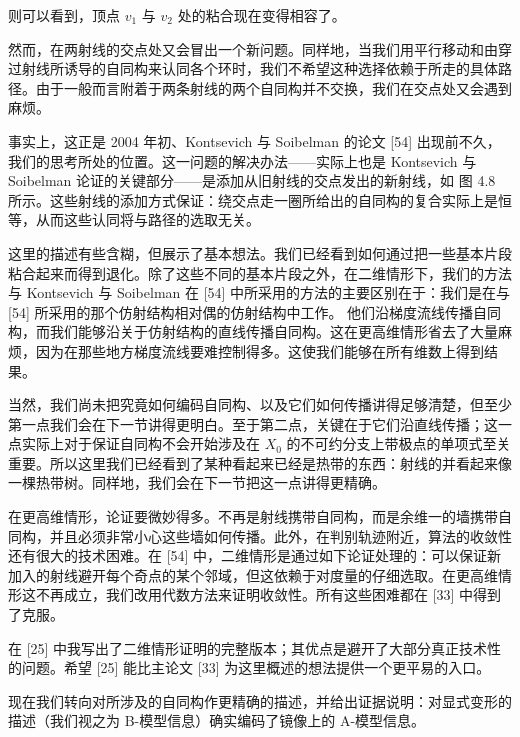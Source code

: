 
则可以看到，顶点 $v_1$ 与 $v_2$ 处的粘合现在变得相容了。

然而，在两射线的交点处又会冒出一个新问题。同样地，当我们用平行移动和由穿过射线所诱导的自同构来认同各个环时，我们不希望这种选择依赖于所走的具体路径。由于一般而言附着于两条射线的两个自同构并不交换，我们在交点处又会遇到麻烦。

事实上，这正是 2004 年初、Kontsevich 与 Soibelman 的论文 [54] 出现前不久，我们的思考所处的位置。这一问题的解决办法------实际上也是 Kontsevich 与 Soibelman 论证的关键部分------是添加从旧射线的交点发出的新射线，如 图 4.8 所示。这些射线的添加方式保证：绕交点走一圈所给出的自同构的复合实际上是恒等，从而这些认同将与路径的选取无关。

这里的描述有些含糊，但展示了基本想法。我们已经看到如何通过把一些基本片段粘合起来而得到退化。除了这些不同的基本片段之外，在二维情形下，我们的方法与 Kontsevich 与 Soibelman 在 [54] 中所采用的方法的主要区别在于：我们是在与 [54] 所采用的那个仿射结构相对偶的仿射结构中工作。
他们沿梯度流线传播自同构，而我们能够沿关于仿射结构的直线传播自同构。这在更高维情形省去了大量麻烦，因为在那些地方梯度流线要难控制得多。这使我们能够在所有维数上得到结果。

当然，我们尚未把究竟如何编码自同构、以及它们如何传播讲得足够清楚，但至少第一点我们会在下一节讲得更明白。至于第二点，关键在于它们沿直线传播；这一点实际上对于保证自同构不会开始涉及在 $X_0$ 的不可约分支上带极点的单项式至关重要。所以这里我们已经看到了某种看起来已经是热带的东西：射线的并看起来像一棵热带树。同样地，我们会在下一节把这一点讲得更精确。

在更高维情形，论证要微妙得多。不再是射线携带自同构，而是余维一的墙携带自同构，并且必须非常小心这些墙如何传播。此外，在判别轨迹附近，算法的收敛性还有很大的技术困难。在 [54] 中，二维情形是通过如下论证处理的：可以保证新加入的射线避开每个奇点的某个邻域，但这依赖于对度量的仔细选取。在更高维情形这不再成立，我们改用代数方法来证明收敛性。所有这些困难都在 [33] 中得到了克服。

在 [25] 中我写出了二维情形证明的完整版本；其优点是避开了大部分真正技术性的问题。希望 [25] 能比主论文 [33] 为这里概述的想法提供一个更平易的入口。

现在我们转向对所涉及的自同构作更精确的描述，并给出证据说明：对显式变形的描述（我们视之为 B-模型信息）确实编码了镜像上的 A-模型信息。

